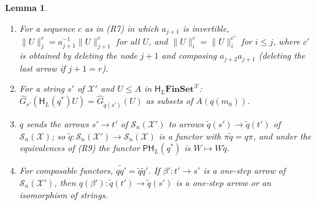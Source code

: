 \documentclass[11pt]{amsart}
\newtheorem{lem}[thm]{Lemma}
\theoremstyle{definition}
\newcommand{\Fin}{\mathbf{FinSet}}
\newcommand{\PP}{\mathsf P}
\newcommand{\HH}{\mathsf H}
\newcommand{\cX}{\mathcal X}
\newcommand{\cS}{\mathcal S}
\begin{document}
\begin{lem}\label{lem:collapse}
\begin{enumerate}
\item[(a)] For a sequence $c$ as in \emph{(R7)} in which $a_{j+1}$ is
invertible, $\|U\|^c_j=a_{j+1}^{-1}\|U\|^c_{j+1}$ for all $U$, and
$\|U\|^c_i=\|U\|^{c'}_i$ for $i\le j$, where $c'$ is obtained by
deleting the node $j+1$ and composing $a_{j+2}a_{j+1}$ (deleting the
last arrow if $j+1=r$).
\item[(b)] For a string $s'$ of $\cX'$ and $U\le A$ in $\HH_L\Fin^\cX$:
$\hat G_{s'}(\HH_L(q^*)U)=\hat G_{\tilde q(s')}(U)$ as subsets of
$A(q(m_0))$.
\item[(c)] $q$ sends the arrows $s'\to t'$ of $\cS_n(\cX')$ to arrows
$\tilde q(s')\to\tilde q(t')$ of $\cS_n(\cX)$; so $\tilde q\colon
\cS_n(\cX')\to\cS_n(\cX)$ is a functor with $\pi\tilde q=q\pi$, and
under the equivalences of \emph{(R9)} the functor $\PP\HH_L(q^*)$ is
$W\mapsto W\tilde q$.
\item[(d)] For composable functors, $\widetilde{qq'}=\tilde q\tilde
q'$. If $\beta'\colon t'\to s'$ is a one-step arrow of $\cS_n(\cX')$,
then $q(\beta')\colon\tilde q(t')\to\tilde q(s')$ is a one-step arrow
or an isomorphism of strings.
\end{enumerate}
\end{lem}
\end{document}
